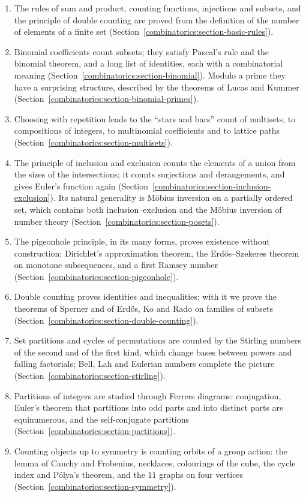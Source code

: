 \begin{enumerate}
\item The rules of sum and product, counting functions, injections and subsets, and the principle of double counting are proved from the definition of the number of elements of a finite set
(Section~\ref{combinatorics:section-basic-rules}).
\item Binomial coefficients count subsets; they satisfy Pascal's rule and the binomial theorem, and a long list of identities, each with a combinatorial meaning
(Section~\ref{combinatorics:section-binomial}). Modulo a prime they have a surprising structure, described by the theorems of Lucas and Kummer (Section~\ref{combinatorics:section-binomial-primes}).
\item Choosing with repetition leads to the ``stars and bars'' count of multisets, to compositions of integers, to multinomial coefficients and to lattice paths
(Section~\ref{combinatorics:section-multisets}).
\item The principle of inclusion and exclusion counts the elements of a union from the sizes of the intersections; it counts surjections and derangements, and gives Euler's function again
(Section~\ref{combinatorics:section-inclusion-exclusion}). Its natural generality is M\"obius inversion on a partially ordered set, which contains both inclusion--exclusion and the M\"obius inversion
of number theory (Section~\ref{combinatorics:section-posets}).
\item The pigeonhole principle, in its many forms, proves existence without construction: Dirichlet's approximation theorem, the Erd\H{o}s--Szekeres theorem on monotone subsequences, and a first
Ramsey number (Section~\ref{combinatorics:section-pigeonhole}).
\item Double counting proves identities and inequalities; with it we prove the theorems of Sperner and of Erd\H{o}s, Ko and Rado on families of subsets (Section~\ref{combinatorics:section-double-counting}).
\item Set partitions and cycles of permutations are counted by the Stirling numbers of the second and of the first kind, which change bases between powers and falling factorials; Bell, Lah and Eulerian
numbers complete the picture (Section~\ref{combinatorics:section-stirling}).
\item Partitions of integers are studied through Ferrers diagrams: conjugation, Euler's theorem that partitions into odd parts and into distinct parts are equinumerous, and the self-conjugate partitions
(Section~\ref{combinatorics:section-partitions}).
\item Counting objects up to symmetry is counting orbits of a group action: the lemma of Cauchy and Frobenius, necklaces, colourings of the cube, the cycle index and P\'olya's theorem, and the $11$
graphs on four vertices (Section~\ref{combinatorics:section-symmetry}).
\end{enumerate}
